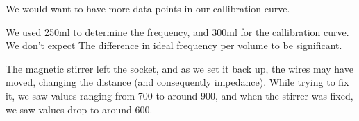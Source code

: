 We would want to have more data points in our callibration curve.

We used 250ml to determine the frequency, and 300ml for the callibration curve. We don't expect The difference in ideal frequency per volume to be significant.

The magnetic stirrer left the socket, and as we set it back up, the wires may have moved, changing the distance (and consequently impedance).
While trying to fix it, we saw values ranging from 700 to around 900, and when the stirrer was fixed, we saw values drop to around 600.  
